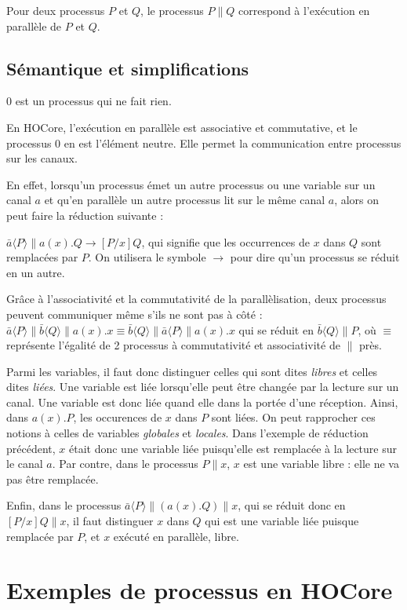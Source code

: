 \documentclass[11pt]{article}
\begin{document}
Pour deux processus $P$ et $Q$, le processus $P\|Q$ correspond à l'exécution en parallèle de $P$ et $Q$.


\subsection{Sémantique et simplifications}
$0$ est un processus qui ne fait rien.

En HOCore, l'exécution en parallèle est associative et commutative, et le processus $0$ en est l'élément neutre. Elle permet la communication entre processus sur les canaux.

En effet, lorsqu'un processus émet un autre processus ou une variable sur un canal $a$ et qu'en parallèle un autre processus lit sur le même canal $a$, alors on peut faire la réduction suivante :

$\bar{a}\langle P\rangle\|a(x).Q \rightarrow [P/x]Q$, qui signifie que les occurrences de $x$ dans $Q$ sont remplacées par $P$. On utilisera le symbole $\rightarrow$ pour dire qu'un processus se réduit en un autre.

Grâce à l'associativité et la commutativité de la parallèlisation, deux processus peuvent communiquer même s'ils ne sont pas à côté : $\bar{a}\langle P\rangle\|\bar{b}\langle Q\rangle\|a(x).x \equiv  \bar{b}\langle Q\rangle\|\bar{a}\langle P\rangle\|a(x).x$ qui se réduit en $\bar{b}\langle Q\rangle\|P$, où $\equiv$ représente l'égalité de 2 processus à commutativité et associativité de $\|$ près.

Parmi les variables, il faut donc distinguer celles qui sont dites \textit{libres} et celles dites \textit{liées}. 
Une variable est liée lorsqu'elle peut être changée par la lecture sur un canal. Une variable est donc liée quand elle dans la portée d'une réception. Ainsi, dans $a(x).P$, les occurences de $x$ dans $P$ sont liées. On peut rapprocher ces notions à celles de variables \textit{globales} et \textit{locales}.
Dans l'exemple de réduction précédent, $x$ était donc une variable liée puisqu'elle est remplacée à la lecture sur le canal $a$. Par contre, dans le processus $P\|x$, $x$ est une variable libre : elle ne va pas être remplacée. 

Enfin, dans le processus $\bar{a}\langle P\rangle\|(a(x).Q)\|x$,  qui se réduit donc en $[P/x]Q\|x$, il faut distinguer $x$ dans $Q$ qui est une variable liée puisque remplacée par $P$, et $x$ exécuté en parallèle, libre. 



\section{Exemples de processus en HOCore}
\end{document}
